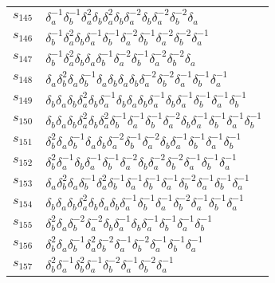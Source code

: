 \documentclass{article}
\begin{document}
\begin{center}
\begin{tabular}{ll}
$s_{145}$ & $\delta_a^{-1}\delta_b^{-1}\delta_a^{2}\delta_b^{}\delta_a^{2}\delta_b^{}\delta_a^{-2}\delta_b^{}\delta_a^{-2}\delta_b^{-2}\delta_a^{}$ \\
$s_{146}$ & $\delta_b^{-1}\delta_a^{2}\delta_b^{}\delta_a^{-1}\delta_b^{-1}\delta_a^{-2}\delta_b^{-1}\delta_a^{-2}\delta_b^{-2}\delta_a^{-1}$ \\
$s_{147}$ & $\delta_b^{-1}\delta_a^{2}\delta_b^{}\delta_a^{}\delta_b^{-1}\delta_a^{-2}\delta_b^{-1}\delta_a^{-2}\delta_b^{-2}\delta_a^{}$ \\
$s_{148}$ & $\delta_a^{}\delta_b^{2}\delta_a^{}\delta_b^{-1}\delta_a^{}\delta_b^{}\delta_a^{}\delta_b^{}\delta_a^{-2}\delta_b^{-2}\delta_a^{-1}\delta_b^{-1}\delta_a^{-1}$ \\
$s_{149}$ & $\delta_b^{}\delta_a^{}\delta_b^{}\delta_a^{2}\delta_b^{}\delta_a^{-1}\delta_b^{}\delta_a^{}\delta_b^{}\delta_a^{-1}\delta_b^{}\delta_a^{-1}\delta_b^{-1}\delta_a^{-1}\delta_b^{-1}$ \\
$s_{150}$ & $\delta_b^{}\delta_a^{}\delta_b^{}\delta_a^{2}\delta_b^{}\delta_a^{2}\delta_b^{-1}\delta_a^{-1}\delta_b^{-1}\delta_a^{-2}\delta_b^{}\delta_a^{-1}\delta_b^{-1}\delta_a^{-1}\delta_b^{-1}$ \\
$s_{151}$ & $\delta_b^{2}\delta_a^{}\delta_b^{-1}\delta_a^{}\delta_b^{}\delta_a^{-2}\delta_b^{-1}\delta_a^{-2}\delta_b^{}\delta_a^{-1}\delta_b^{-1}\delta_a^{-1}\delta_b^{-1}$ \\
$s_{152}$ & $\delta_b^{2}\delta_a^{-1}\delta_b^{}\delta_a^{-1}\delta_b^{-1}\delta_a^{-2}\delta_b^{}\delta_a^{-2}\delta_b^{-2}\delta_a^{-1}\delta_b^{-1}\delta_a^{-1}$ \\
$s_{153}$ & $\delta_a^{}\delta_b^{2}\delta_a^{}\delta_b^{-1}\delta_a^{2}\delta_b^{-1}\delta_a^{-1}\delta_b^{-1}\delta_a^{-1}\delta_b^{-2}\delta_a^{-1}\delta_b^{-1}\delta_a^{-1}$ \\
$s_{154}$ & $\delta_b^{}\delta_a^{}\delta_b^{}\delta_a^{2}\delta_b^{}\delta_a^{}\delta_b^{}\delta_a^{-1}\delta_b^{-1}\delta_a^{-1}\delta_b^{-2}\delta_a^{-1}\delta_b^{-1}\delta_a^{-1}$ \\
$s_{155}$ & $\delta_b^{2}\delta_a^{}\delta_b^{-2}\delta_a^{-2}\delta_b^{}\delta_a^{-1}\delta_b^{}\delta_a^{-1}\delta_b^{-1}\delta_a^{-1}\delta_b^{-1}$ \\
$s_{156}$ & $\delta_b^{2}\delta_a^{}\delta_b^{-1}\delta_a^{2}\delta_b^{-2}\delta_a^{-1}\delta_b^{-2}\delta_a^{-1}\delta_b^{-1}\delta_a^{-1}$ \\
$s_{157}$ & $\delta_b^{2}\delta_a^{-1}\delta_b^{2}\delta_a^{-1}\delta_b^{-2}\delta_a^{-1}\delta_b^{-2}\delta_a^{-1}$ \\

\end{tabular}
\end{center}
\end{document}
